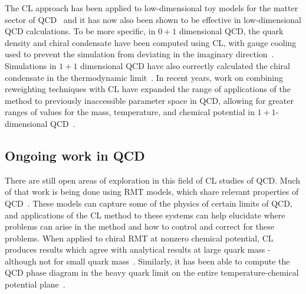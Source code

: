 \documentclass[../main.tex]{subfiles}
\begin{document}
The CL approach has been applied to low-dimensional toy models for the matter sector of QCD~\cite{Pawlowski:2013pje,Pawlowski:2013gag} 
and it has now also been shown to be effective in low-dimensional QCD calculations. To be more specific, 
in $0+1$ dimensional QCD, the quark density and chiral condensate have been computed using CL, with gauge cooling used to prevent the simulation from deviating in the imaginary direction~\cite{Bloch:2015coa}. Simulations in $1+1$ dimensional QCD have also correctly calculated the chiral condensate in the thermodynamic limit~\cite{JHEP0820101017}. In recent years, work on combining reweighting techniques with CL have expanded the range of applications of the method to previously inaccessible parameter space in QCD, allowing for greater ranges of values for the mass, temperature, and chemical potential in $1+1$-dimensional QCD~\cite{Bloch:2017sfg,PhysRevD95054509}. 

\subsection{Ongoing work in QCD}
There are still open areas of exploration in this field of CL studies of QCD. 
Much of that work is being done using RMT models, which share
relevant properties of QCD~\cite{2018JHEP03015B}. These models can capture some of
the physics of certain limits of QCD, and applications of the CL method to these systems can help elucidate where problems
can arise in the method and how to control and correct for these problems. When applied to chiral RMT at nonzero chemical
potential, CL produces results which agree with analytical results at large quark mass - although not for small quark
mass~\cite{PRD201311116007}. Similarly, it has been able to compute the QCD phase diagram in the heavy quark limit on the
entire temperature-chemical potential plane~\cite{Aarts:2013nja, POSInsightsintoHDQCDusingCL, Aarts:2016qrv}.
\end{document}
